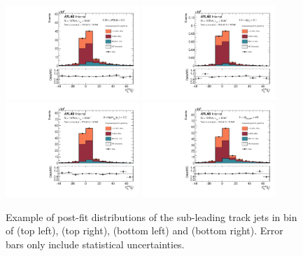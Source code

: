 \begin{figure}[htbp]
  \centering
 \includegraphics[width=0.45\textwidth]{figures/gbb/paperplots/Canv_Fit_b0_25_DeltaR_0_3_LpT_INF_SpT_INF_coarse_y}
 \includegraphics[width=0.45\textwidth]{figures/gbb/paperplots/Canv_Fit_b0_25_zpt_0_3_LpT_INF_SpT_INF_coarse_y}
 \includegraphics[width=0.45\textwidth]{figures/gbb/paperplots/Canv_Fit_b0_25_M_0_3_LpT_INF_SpT_INF_coarse_y}
 \includegraphics[width=0.45\textwidth]{figures/gbb/paperplots/Canv_Fit_b0_25_dphi_0_3_LpT_INF_SpT_INF_coarse_y}
\caption{Example of post-fit \subsdzero distributions of the sub-leading track jets in bin of \drbb (top left), \zpt (top right), \mpt (bottom left) and \dphi (bottom right). Error bars only include statistical uncertainties.}
  \label{fig:fit-example-subleading}
\end{figure}


